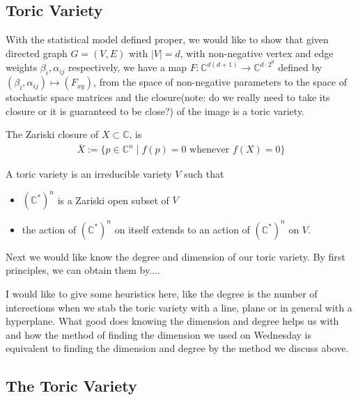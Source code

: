 
\subsection*{Toric Variety}

With the statistical model defined proper, we would like to show that given directed graph $G = (V,E)$  with $|V| = d$, with non-negative vertex and edge weights $\beta_i, \alpha_{ij}$ respectively, we have a map $F: \mathbb{C}^{d(d+1)} \to \mathbb{C}^{d\cdot 2^d}$ defined by $(\beta_i,\alpha_{ij})\mapsto (F_{xy})$, from the space of non-negative parameters to the space of stochastic space matrices and the closure(note: do we really need to take its closure or it is guaranteed to be close?) of the image is a toric variety.

The Zariski closure of $X \subset \mathbb{C}$, is
\begin{align*}
\overline{X}:=\{p \in \mathbb{C}^n \mid f(p) = 0 \text{ whenever } f(X) = 0\}
\end{align*}


\begin{defn}
A toric variety is an irreducible variety $V$ such that
\begin{itemize}
\item $(\mathbb{C}^\ast)^n$ is a Zariski open subset of $V$
\item the action of $(\mathbb{C}^\ast)^n$ on itself extends to an action of $(\mathbb{C}^\ast)^n$ on $V$.
\end{itemize}
\end{defn}

Next we would like know the degree and dimension of our toric variety. By first principles, we can obtain them by.... 


{\color{blue}I would like to give some heuristics here, like the degree is the number of interections when we stab the toric variety with a line, plane or in general with a hyperplane. What good does knowing the dimension and degree helps us with and how the method of finding the dimension we used on Wednesday is equivalent to finding the dimension and degree by the method we discuss above.}

\subsection*{The Toric Variety}

